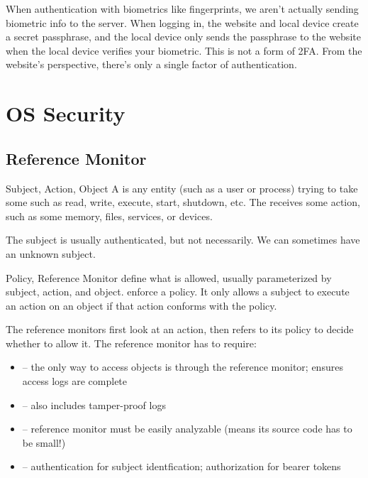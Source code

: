 \documentclass[12pt]{report}
\begin{document}
\begin{notebox}{}
    When authentication with biometrics like fingerprints, we aren't actually sending biometric info to the server. When logging in, the website and local device create a secret passphrase, and the local device only sends the passphrase to the website when the local device verifies your biometric. This is not a form of 2FA. From the website's perspective, there's only a single factor of authentication.
\end{notebox}

\chapter{OS Security}
\section{Reference Monitor}

\begin{dfnbox}{Subject, Action, Object}{}
    A  is any entity (such as a user or process) trying to take some  such as read, write, execute, start, shutdown, etc. The  receives some action, such as some memory, files, services, or devices.
\end{dfnbox}

The subject is usually authenticated, but not necessarily. We can sometimes have an unknown subject.

\begin{dfnbox}{Policy, Reference Monitor}{}
     define what is allowed, usually parameterized by subject, action, and object.  enforce a policy. It only allows a subject to execute an action on an object if that action conforms with the policy.
\end{dfnbox}

The reference monitors first look at an action, then refers to its policy to decide whether to allow it. The reference monitor has to require:

\begin{itemize}
    \item {} -- the only way to access objects is through the reference monitor; ensures access logs are complete
    \item {} -- also includes tamper-proof logs
    \item {} -- reference monitor must be easily analyzable (means its source code has to be small!)
    \item {} -- authentication for subject identfication; authorization for bearer tokens
\end{itemize}
\end{document}
